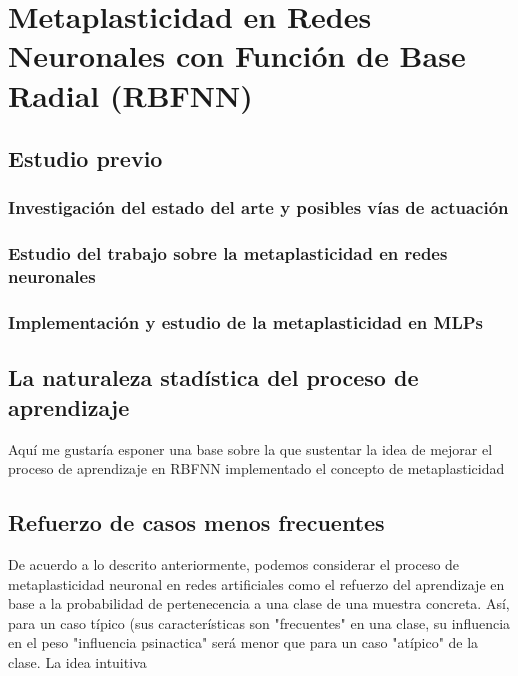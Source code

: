 \documentclass[10pt,a4paper, twocolumn]{report}
\begin{document}
\chapter{Metaplasticidad en Redes Neuronales con Función de Base Radial (RBFNN)}
\section{Estudio previo}
\subsection{Investigación del estado del arte y posibles vías de actuación}

\subsection{Estudio del trabajo sobre la metaplasticidad en redes neuronales}
\subsection{Implementación y estudio de la metaplasticidad en MLPs}
\section{La naturaleza stadística del proceso de aprendizaje}
Aquí me gustaría esponer una base sobre la que sustentar la idea de mejorar el proceso de aprendizaje en RBFNN implementado el concepto de metaplasticidad
\section{Refuerzo de casos menos frecuentes}
De acuerdo a lo descrito anteriormente, podemos considerar el proceso de metaplasticidad neuronal en redes artificiales como el refuerzo del aprendizaje en base a la probabilidad de pertenecencia a una clase de una muestra concreta. Así, para un caso típico (sus características son "frecuentes" en una clase, su influencia en el peso "influencia psinactica" será menor que para un caso "atípico" de la clase.
La idea intuitiva   
\end{document}
